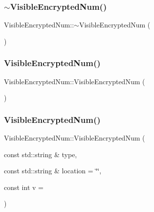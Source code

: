\subsubsection{\texorpdfstring{$\sim$\+Visible\+Encrypted\+Num()}{~VisibleEncryptedNum()}}
{\footnotesize\ttfamily Visible\+Encrypted\+Num\+::$\sim$\+Visible\+Encrypted\+Num (\begin{DoxyParamCaption}{ }\end{DoxyParamCaption})\hspace{0.3cm}{\ttfamily [virtual]}}

\mbox{\label{class_visible_encrypted_num_a7a9d1fff65748c1fdae31d06013a74e4}} 
\subsubsection{\texorpdfstring{Visible\+Encrypted\+Num()}{VisibleEncryptedNum()}\hspace{0.1cm}{\footnotesize\ttfamily [1/2]}}
{\footnotesize\ttfamily Visible\+Encrypted\+Num\+::\+Visible\+Encrypted\+Num (\begin{DoxyParamCaption}{ }\end{DoxyParamCaption})}

\mbox{\label{class_visible_encrypted_num_ab2e78be9742797eb41e9e80d0e6d594f}} 
\subsubsection{\texorpdfstring{Visible\+Encrypted\+Num()}{VisibleEncryptedNum()}\hspace{0.1cm}{\footnotesize\ttfamily [2/2]}}
{\footnotesize\ttfamily Visible\+Encrypted\+Num\+::\+Visible\+Encrypted\+Num (\begin{DoxyParamCaption}\item[{const std\+::string \&}]{type,  }\item[{const std\+::string \&}]{location = {\ttfamily \char`\"{}\char`\"{}},  }\item[{const int}]{v = {} }\end{DoxyParamCaption})}


